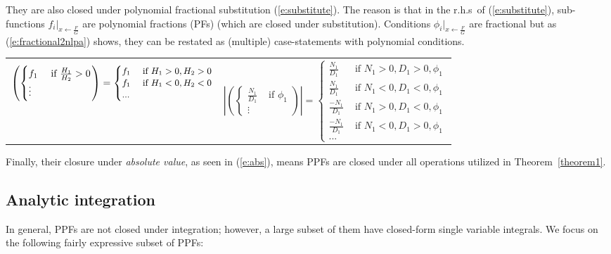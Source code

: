 \documentclass{article} %
\newcommand{\case}[2]{#2 &\text{ if } #1}%
\begin{document}
%
They are also closed under polynomial fractional substitution (\ref{e:substitute}). 
The reason is that in the r.h.s\ of (\ref{e:substitute}), 
sub-functions $f_i |_{x \leftarrow \frac{F}{G}}$ are polynomial fractions (PFs) 
(which are closed under substitution).
Conditions ${\phi_i}|_{x \leftarrow \frac{F}{G}}$ are fractional but as
(\ref{e:fractional2nlpa}) shows, 
they can be restated as (multiple) case-statements with polynomial conditions. 
\\
{\scriptsize
\begin{tabular}{p{7cm}p{6.4cm}}
{
\vspace{3mm}
\begin{equation} 
\label{e:fractional2nlpa}
\left(
 \begin{cases}
  \case{\frac{H_1}{H_2} > 0}{f_1} \\
   \vdots
 \end{cases} 
\right)
 =
{\footnotesize
\begin{cases}
  \case{H_1 > 0, H_2 > 0 }{f_1} \\ 
  \case{H_1 < 0, H_2 < 0}{f_1} \\ 
  ...
 \end{cases} 
}
\end{equation}
}
&{
\begin{equation}\label{e:abs}
\left|
\left(
  \begin{cases}
  \case{\phi_1}{\frac{N_1}{D_1}}\\
  \vdots
  \end{cases}
\right)
\right|
=
  \begin{cases}
  \case{N_1>0, D_1>0,\phi_1}{\frac{N_1}{D_1}} \\
\case{N_1<0, D_1<0,\phi_1}{\frac{N_1}{D_1}} \\
\case{N_1>0, D_1<0,\phi_1}{\frac{-N_1}{D_1}} \\
\case{N_1<0, D_1>0,\phi_1}{\frac{-N_1}{D_1}} \\
...
 \end{cases}
\end{equation}
}
\end{tabular}
}
Finally, their closure under \emph{absolute value}, as seen in  (\ref{e:abs}), 
means PPFs are closed under all operations utilized in Theorem~\ref{theorem1}.

\subsection{Analytic integration}
In general, PPFs are not closed under integration; however, a large subset of them 
 have closed-form single variable integrals.
We focus on the following fairly expressive  subset of PPFs:
\end{document}
